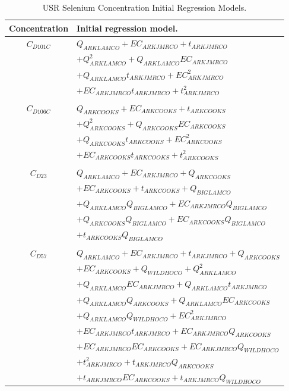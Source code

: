 \begin{linenumbers}
\begin{table}[htbp]
\centering
\caption{USR Selenium Concentration Initial Regression Models.}
\label{tab:DSRInitialRegression}
\begin{tabular}{c l}
	\toprule
	Concentration		& Initial regression model. \\
	\toprule
	$ C_{D101C} $	& $Q_{ARKLAMCO} + EC_{ARKJMRCO} + t_{ARKJMRCO}$\\
					& $+Q_{ARKLAMCO}^2 + Q_{ARKLAMCO}EC_{ARKJMRCO}$\\
					& $+ Q_{ARKLAMCO}t_{ARKJMRCO} + EC_{ARKJMRCO}^2$\\
					& $+ EC_{ARKJMRCO}t_{ARKJMRCO} + t_{ARKJMRCO}^2$\\
	\\
	$ C_{D106C} $	& $Q_{ARKCOOKS} + EC_{ARKCOOKS} + t_{ARKCOOKS}$\\
					& $+Q_{ARKCOOKS}^2 + Q_{ARKCOOKS}EC_{ARKCOOKS}$\\
					& $+ Q_{ARKCOOKS}t_{ARKCOOKS} + EC_{ARKCOOKS}^2$\\
					& $+ EC_{ARKCOOKS}t_{ARKCOOKS} + t_{ARKCOOKS}^2$\\
	\\
	$ C_{D23} $		& $Q_{ARKLAMCO} + EC_{ARKJMRCO} + Q_{ARKCOOKS}$\\ 
					& $+ EC_{ARKCOOKS} + t_{ARKCOOKS} + Q_{BIGLAMCO}$\\
					& $+ Q_{ARKLAMCO}Q_{BIGLAMCO} + EC_{ARKJMRCO}Q_{BIGLAMCO}$\\
					& $+ Q_{ARKCOOKS}Q_{BIGLAMCO} + EC_{ARKCOOKS}Q_{BIGLAMCO}$\\
					& $+ t_{ARKCOOKS}Q_{BIGLAMCO}$\\
	\\
	$ C_{D57} $		& $Q_{ARKLAMCO} + EC_{ARKJMRCO} + t_{ARKJMRCO} + Q_{ARKCOOKS}$\\
					& $+ EC_{ARKCOOKS} + Q_{WILDHOCO} + Q_{ARKLAMCO}^2 $\\
					& $+ Q_{ARKLAMCO} EC_{ARKJMRCO}+ Q_{ARKLAMCO} t_{ARKJMRCO} $\\
					& $+ Q_{ARKLAMCO} Q_{ARKCOOKS}+ Q_{ARKLAMCO} EC_{ARKCOOKS} $\\
					& $+ Q_{ARKLAMCO} Q_{WILDHOCO}+ EC_{ARKJMRCO}^2 $\\
					& $+ EC_{ARKJMRCO} t_{ARKJMRCO}+ EC_{ARKJMRCO} Q_{ARKCOOKS} $\\
					& $+ EC_{ARKJMRCO} EC_{ARKCOOKS}+ EC_{ARKJMRCO} Q_{WILDHOCO} $\\
					& $+ t_{ARKJMRCO}^2+ t_{ARKJMRCO} Q_{ARKCOOKS} $\\
					& $+ t_{ARKJMRCO} EC_{ARKCOOKS}+ t_{ARKJMRCO} Q_{WILDHOCO} $\\

\end{tabular}
\end{table}
\end{linenumbers}
